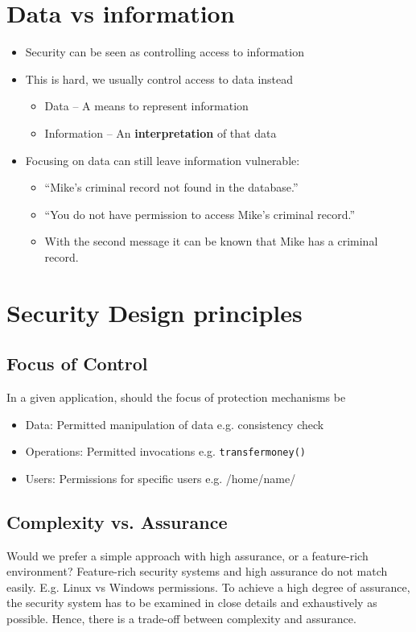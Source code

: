 \documentclass{article}
\begin{document}
\section{Data vs information}
\begin{itemize}
  \item Security can be seen as controlling access to information 
  \item This is hard, we usually control access to data instead  
  \begin{itemize}
    \item Data – A means to represent information 
    \item Information – An \textbf{interpretation} of that data 
  \end{itemize}  
  \item Focusing on data can still leave information vulnerable:
  \begin{itemize}
    \item “Mike’s criminal record not found in the database.”
    \item “You do not have permission to access Mike’s criminal record.”
    \item With the second message it can be known that Mike has a criminal record.
  \end{itemize}
\end{itemize}

\section{Security Design principles}

\subsection{Focus of Control}
\begin{flushleft}
In a given application, should the focus of protection mechanisms be
\begin{itemize}
  \item Data: Permitted manipulation of data e.g. consistency check
  \item Operations: Permitted invocations e.g. \verb!transfermoney()!
  \item Users: Permissions for specific users e.g. /home/name/
\end{itemize}
\end{flushleft}

\subsection{Complexity vs. Assurance}
\begin{flushleft}
Would we prefer a simple approach with high assurance, or a feature-rich environment? Feature-rich security systems and high assurance do not match easily. E.g. Linux vs Windows permissions. To achieve a high degree of assurance, the security system has to be examined in close details and exhaustively as possible. Hence, there is a trade-off between complexity and assurance.
\end{flushleft}
\end{document}
